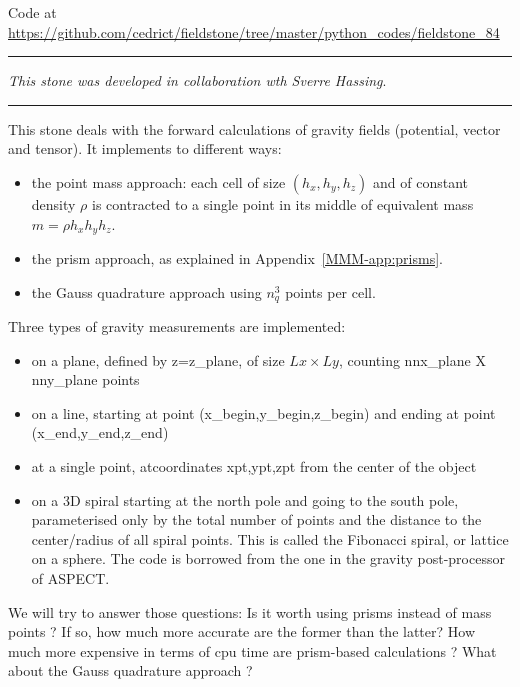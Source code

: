 

\begin{center}
Code at \url{https://github.com/cedrict/fieldstone/tree/master/python_codes/fieldstone_84}
\end{center}

\par\noindent\rule{\textwidth}{0.4pt}

{\sl This stone was developed in collaboration wth Sverre Hassing}. 

\par\noindent\rule{\textwidth}{0.4pt}

This stone deals with the forward calculations of gravity fields (potential, vector and tensor).
It implements to different ways: 
\begin{itemize}
\item the point mass approach: each cell of size $(h_x,h_y,h_z)$ and of constant density $\rho$
is contracted to a single point in its middle of equivalent mass $m=\rho h_xh_yh_z$.
\item the prism approach, as explained in Appendix~\ref{MMM-app:prisms}.
\item the Gauss quadrature approach using $n_q^3$ points per cell.
\end{itemize}

Three types of gravity measurements are implemented:
\begin{itemize}
\item on a plane, defined by z=z\_{plane}, of size $Lx \times Ly$, counting nnx\_plane X nny\_plane points
\item on a line, starting at point (x\_begin,y\_begin,z\_begin) and ending at point (x\_end,y\_end,z\_end)
\item at a single point, atcoordinates xpt,ypt,zpt from the center of the object
\item on a 3D spiral starting at the north pole and going to the south pole, parameterised only 
by the total number of points and the distance to the center/radius of all spiral points.
This is called the Fibonacci spiral, or lattice on a sphere. The code is borrowed from the 
one in the gravity post-processor of ASPECT.
\end{itemize}

We will try to answer those questions:
Is it worth using prisms instead of mass points ?  
If so, how much more accurate are the former than the latter?
How much more expensive in terms of cpu time are prism-based calculations ?
What about the Gauss quadrature approach ? 

